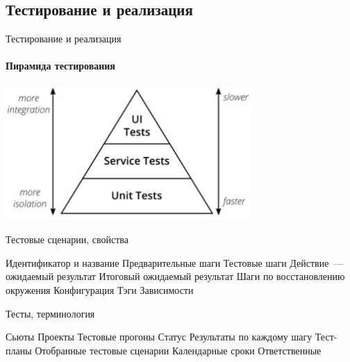 \documentclass{../../slides-style}
\begin{document}
    \subsection{Тестирование и реализация}

    \begin{frame}{Тестирование и реализация}
        \framesubtitle{Пирамида тестирования}
        \begin{center}
            \includegraphics[width=0.7\textwidth]{testPyramid.png}
        \end{center}
    \end{frame}

    \begin{frame}{Тестовые сценарии, свойства}
        \begin{outline}
            \1 Идентификатор и название
            \1 Предварительные шаги
            \1 Тестовые шаги
                \2 Действие~--- ожидаемый результат
            \1 Итоговый ожидаемый результат
            \1 Шаги по восстановлению окружения
            \1 Конфигурация
            \1 Тэги
            \1 Зависимости
        \end{outline}
    \end{frame}

    \begin{frame}{Тесты, терминология}
        \begin{outline}
            \1 Сьюты
            \1 Проекты
            \1 Тестовые прогоны
                \2 Статус
                \2 Результаты по каждому шагу
            \1 Тест-планы
                \2 Отобранные тестовые сценарии
                \2 Календарные сроки
                \2 Ответственные
        \end{outline}
    \end{frame}
\end{document}
